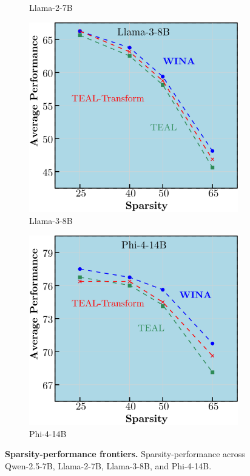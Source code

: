 {\begin{figure}[t]
\begin{subfigure}[t]{0.24\linewidth}
        \caption{Llama-2-7B}
        \label{fig:llama-2-7b}
    \end{subfigure}
    \begin{subfigure}[t]{0.24\linewidth}
        \centering
        \includegraphics[width=\linewidth]{llama_3_8b.png}
        \caption{Llama-3-8B}
        \label{fig:llama-3-8b}
    \end{subfigure}
    \begin{subfigure}[t]{0.24\linewidth}
        \centering
        \includegraphics[width=\linewidth]{phi_4_14b.png}
        \caption{Phi-4-14B}
        \label{fig:phi-4-14b}
    \end{subfigure}
    \caption{\textbf{Sparsity-performance frontiers.} Sparsity-performance across Qwen-2.5-7B, Llama-2-7B, Llama-3-8B, and Phi-4-14B.}
    \label{fig:qwen-overview}
\end{figure}

}
